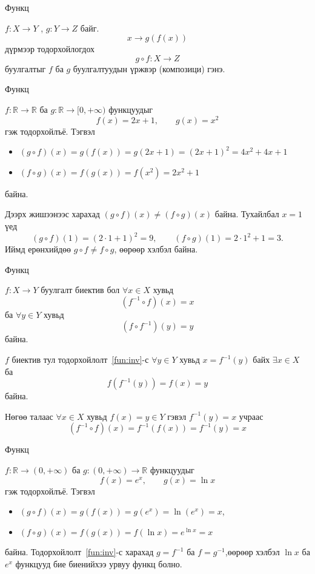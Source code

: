 \begin{frame}[allowframebreaks]{Функц}
\begin{definition}
$f:X\to Y$ , $g:Y\to Z$ байг. $$x\to g(f(x))$$ дүрмээр тодорхойлогдох $$g\circ f:X\to Z$$ буулгалтыг $f$ ба $g$ буулгалтуудын үржвэр (композици) гэнэ. 
\end{definition}
\end{frame}

\begin{frame}[allowframebreaks]{Функц}
\begin{example}
$f:\mathbb{R}\to\mathbb{R}$ ба $g:\mathbb{R}\to[0,+\infty)$ функцуудыг
\[
f(x)=2x+1,\qquad g(x)=x^2
\]
гэж тодорхойлъё. Тэгвэл
\begin{itemize}
    \item $(g\circ f)(x)=g(f(x))=g(2x+1)=(2x+1)^2=4x^2+4x+1$
    \item $(f\circ g)(x)=f(g(x))=f(x^2)=2x^2+1$
\end{itemize} байна. 

Дээрх жишээнээс харахад $(g\circ f)(x)\neq (f\circ g)(x)$ байна. Тухайлбал $x=1$ үед 
\[
(g\circ f)(1)=(2\cdot 1+1)^2=9,\qquad (f\circ g)(1)=2\cdot 1^2+1=3.
\]
Иймд ерөнхийдөө $g\circ f\neq f\circ g$, өөрөөр хэлбэл  байна.
\end{example}
\end{frame}

\begin{frame}[allowframebreaks]{Функц}
\begin{theorem}\label{fun:inv_comp}
$f:X\to Y$ буулгалт биектив бол
 $\forall x\in X$ хувьд $$(f^{-1}\circ f)(x)=x$$ ба $\forall y\in Y$ хувьд $$(f\circ f^{-1})(y)=y$$ 
 байна.
\end{theorem}

\begin{prof}
$f$ биектив тул тодорхойлолт~\ref{fun:inv}-с $\forall y\in Y$ хувьд
$x=f^{-1}(y)$ байх $\exists x\in X$ ба
\[
f\!\left(f^{-1}(y)\right)=f(x)=y
\]
байна. 

Нөгөө талаас $\forall x\in X$ хувьд $f(x)=y\in Y$ гэвэл $f^{-1}(y)=x$ учраас
\[
(f^{-1}\circ f)(x)=f^{-1}(f(x))=f^{-1}(y)=x
\]
\end{prof}
\end{frame}

\begin{frame}[allowframebreaks]{Функц}
\begin{example}
$f:\mathbb{R}\to(0,+\infty)$ ба $g:(0,+\infty)\to\mathbb{R}$ функцуудыг
\[
f(x)=e^x,\qquad g(x)=\ln x
\]
гэж тодорхойлъё. Тэгвэл
\begin{itemize}
    \item $(g\circ f)(x)=g(f(x))=g(e^x)=\ln(e^x)=x$,
    \item $(f\circ g)(x)=f(g(x))=f(\ln x)=e^{\ln x}=x$
    \end{itemize} байна. 
Тодорхойлолт~\ref{fun:inv}-с харахад $g=f^{-1}$ ба $f=g^{-1}$,өөрөөр хэлбэл $\ln x$ ба $e^x$ функцууд бие биенийхээ урвуу функц болно.
\end{example}
\end{frame}

